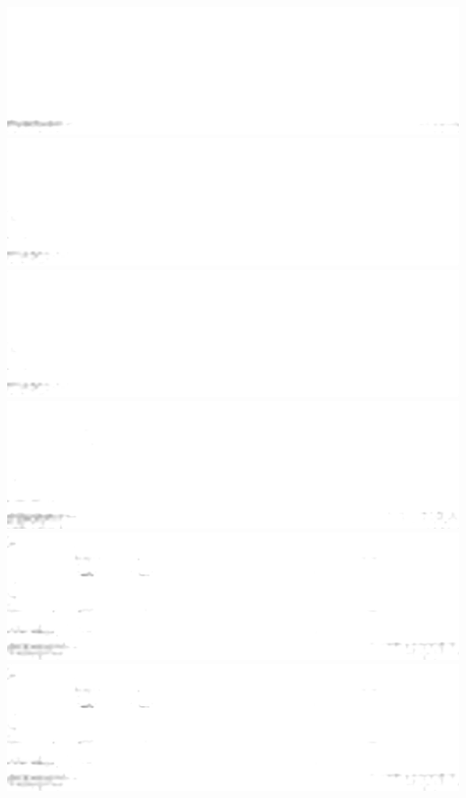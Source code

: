 \documentclass{beamer}
\begin{document}
\begin{frame}
        \includegraphics[height=0.023\textheight]{spatial-denoised/wavelet_den_61.png}
        \includegraphics[height=0.023\textheight]{spatial-denoised/wavelet_den_62.png}
        \includegraphics[height=0.023\textheight]{spatial-denoised/wavelet_den_62.png}
        \includegraphics[height=0.023\textheight]{spatial-denoised/wavelet_den_63.png}
        \includegraphics[height=0.023\textheight]{spatial-denoised/wavelet_den_64.png}
        \includegraphics[height=0.023\textheight]{spatial-denoised/wavelet_den_64.png}

\end{frame}
\end{document}
